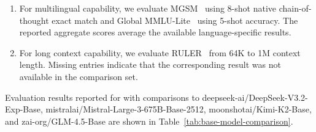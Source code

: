 \begin{enumerate}
    \item For multilingual capability, we evaluate MGSM~\citep{shi2022languagemodelsmultilingualchainofthought} using 8-shot native chain-of-thought exact match and Global MMLU-Lite~\citep{singh2024globalmmluunderstandingaddressing} using 5-shot accuracy. The reported aggregate scores average the available language-specific results.

    \item For long context capability, we evaluate RULER~\citep{hsieh2024ruler} from 64K to 1M context length. Missing entries indicate that the corresponding result was not available in the comparison set.

\end{enumerate}

Evaluation results reported for \ourbasemodel with comparisons to deepseek-ai/DeepSeek-V3.2-Exp-Base, mistralai/Mistral-Large-3-675B-Base-2512, moonshotai/Kimi-K2-Base, and zai-org/GLM-4.5-Base are shown in Table~\ref{tab:base-model-comparison}.